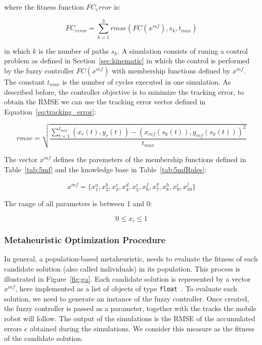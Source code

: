 \documentclass[symmetry,article,submit,moreauthors,pdftex]{Definitions/mdpi}
\begin{document}
where the fitness function $FC_error$ is:

\begin{equation}
  FC_{error} = \sum_{k=1}^3 rmse(FC(x^{mf}), s_k, t_{max}) 
\end{equation}

in which $k$ is the number of paths $s_k$. A simulation consists of runing a control problem as 
defined in Section~\ref{sec:kinematic} in which the control is
performed by the fuzzy controller $FC(x^{mf})$ with membership functions
defined by $x^{mf}$. The constant $t_{max}$ is the number of cycles executed in one simulation.
As described before, the controller objective is to minimize the tracking error, 
to obtain the RMSE we can use the tracking error vector defined in Equation~\ref{eq:tracking_error}:

\begin{equation}\label{eq:tracking_error}
 rmse = \sqrt{\frac{\sum_{t=1}^{t_{max}} (x_r(t),y_r(t))-(x_{ref}(s_k(t)),y_{ref}(s_k(t)))^2}{t_{max}}}
\end{equation}

The vector $x^{mf}$ defines the paremeters of the membership functions defined in Table~\ref{tab:5mf} 
and the knowledge base in Table~\ref{tab:5mfRules}: 

\begin{equation}\label{eq:mfs}
 x^{mf} = \{x_1^a, x_2^b, x_3^c, x_4^d, x_5^e, x_6^f, x_7^g, x_8^h, x_9^i, x_{10}^j\}
\end{equation}

The range of all parameters is between 1 and 0: 

\begin{equation}\label{eq:mfs}
  0 \leq x_i \leq 1
\end{equation}


\subsubsection{Metaheuristic Optimization Procedure}\label{sec:GAO}

In general, a population-based metaheuristic, needs to evaluate the fitness of
each candidate solution (also called individuals) in its population. This
process is illustrated in Figure~\ref{fig:ga}. Each candidate solution is
represented by a vector $x^{mf}$, here implemented as a list of objects of type {
\tt float }. To evaluate each solution, we need to generate an instance of the
fuzzy controller. Once created, the fuzzy controller is passed as a
parameter, together with the tracks the mobile robot will follow. The output of
the simulations is the RMSE of the accumulated errors $e$ obtained during the
simulations. We consider this measure as the fitness of the candidate solution.
\end{document}
